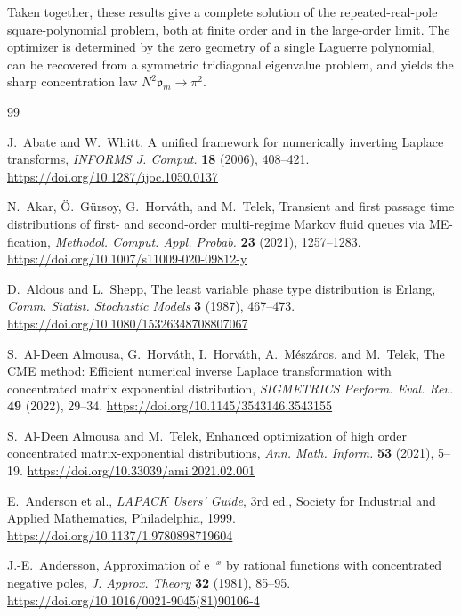 \documentclass[11pt]{article}
\numberwithin{equation}{section}
\theoremstyle{definition}
\theoremstyle{remark}
\newcommand{\e}{\mathrm e}
\begin{document}
Taken together, these results give a complete solution of the repeated-real-pole
square-polynomial problem, both at finite order and in the large-order limit.
The optimizer is determined by the zero geometry of a single Laguerre
polynomial, can be recovered from a symmetric tridiagonal eigenvalue problem,
and yields the sharp concentration law $N^2\mathfrak v_m\longrightarrow\pi^2$.

\begin{thebibliography}{99}

J.~Abate and W.~Whitt,
A unified framework for numerically inverting Laplace transforms,
\emph{INFORMS J. Comput.} \textbf{18} (2006), 408--421.
\url{https://doi.org/10.1287/ijoc.1050.0137}

N.~Akar, \"O.~G\"ursoy, G.~Horv\'ath, and M.~Telek,
Transient and first passage time distributions of first- and second-order
multi-regime Markov fluid queues via ME-fication,
\emph{Methodol. Comput. Appl. Probab.} \textbf{23} (2021), 1257--1283.
\url{https://doi.org/10.1007/s11009-020-09812-y}

D.~Aldous and L.~Shepp,
The least variable phase type distribution is Erlang,
\emph{Comm. Statist. Stochastic Models} \textbf{3} (1987), 467--473.
\url{https://doi.org/10.1080/15326348708807067}

S.~Al-Deen Almousa, G.~Horv\'ath, I.~Horv\'ath, A.~M\'esz\'aros, and M.~Telek,
The CME method: Efficient numerical inverse Laplace transformation with
concentrated matrix exponential distribution,
\emph{SIGMETRICS Perform. Eval. Rev.} \textbf{49} (2022), 29--34.
\url{https://doi.org/10.1145/3543146.3543155}

S.~Al-Deen Almousa and M.~Telek,
Enhanced optimization of high order concentrated matrix-exponential
distributions,
\emph{Ann. Math. Inform.} \textbf{53} (2021), 5--19.
\url{https://doi.org/10.33039/ami.2021.02.001}


E.~Anderson et al.,
\emph{LAPACK Users' Guide}, 3rd ed.,
Society for Industrial and Applied Mathematics, Philadelphia, 1999.
\url{https://doi.org/10.1137/1.9780898719604}



J.-E.~Andersson,
Approximation of $\e^{-x}$ by rational functions with concentrated negative
poles,
\emph{J. Approx. Theory} \textbf{32} (1981), 85--95.
\url{https://doi.org/10.1016/0021-9045(81)90106-4}



\end{thebibliography}
\end{document}

